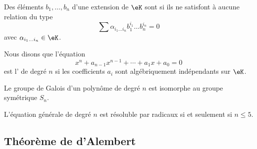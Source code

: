 \begin{definition}
    Des éléments \( b_1,\ldots, b_n\) d'une extension de \( \eK\) sont  si ils ne satisfont à aucune relation du type
    \begin{equation}
        \sum \alpha_{i_1\ldots i_n}b_1^{i_1}\ldots b_n^{i_n}=0
    \end{equation}
    avec \( \alpha_{i_1\ldots i_n}\in \eK\).
\end{definition}

Nous disons que l'équation
\begin{equation}
    x^n+a_{n-1}x^{n-1}+\cdots+a_1x+a_0=0
\end{equation}
est l' de degré \( n\) si les coefficients \( a_i\) sont algébriquement indépendants sur \( \eK\).

\begin{theorem}
    Le groupe de Galois d'un polynôme de degré \( n\) est isomorphe au groupe symétrique \( S_n\).
\end{theorem}

\begin{corollary}
    L'équation générale de degré \( n\) est résoluble par radicaux si et seulement si \( n\le 5\).
\end{corollary}

\subsection{Théorème de d'Alembert}


